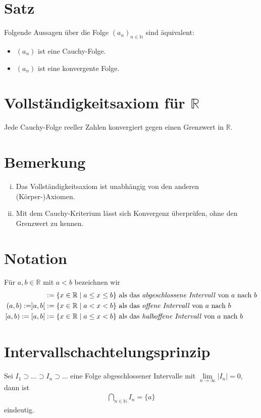 \documentclass{scrreprt}
\newcommand{\NN}{\mathbb{N}}
\newcommand{\RR}{\mathbb{R}}
\begin{document}
    \section{Satz}
    Folgende Aussagen über die Folge $(a_n)_{n \in \NN}$ sind äquivalent:
    \begin{itemize}
        \item
            $(a_n)$ ist eine Cauchy-Folge.
        \item
            $(a_n)$ ist eine konvergente Folge.
    \end{itemize}

    \section{Vollständigkeitsaxiom für $\RR$}
    Jede Cauchy-Folge reeller Zahlen konvergiert gegen einen Grenzwert in $\RR$.

    \section{Bemerkung}
    \begin{enumerate}[i)]
        \item
            Das Vollständigkeitsaxiom ist unabhängig von den anderen (Körper-)Axiomen.
        \item
            Mit dem Cauchy-Kriterium lässt sich Konvergenz überprüfen, ohne den Grenzwert zu kennen.
    \end{enumerate}

    \section{Notation}
    Für $a,b \in \RR$ mit $a < b$ bezeichnen wir
    \begin{align*}
        [a,b] &:= \lbrace x \in \RR \mid a \leq x \leq b \rbrace \text{ als das \emph{abgeschlossene Intervall} von $a$ nach $b$}\\
        (a,b) := ]a,b[ &:= \lbrace x \in \RR \mid a < x < b \rbrace \text{ als das \emph{offene Intervall} von $a$ nach $b$}\\
        [a,b) := [a,b[ &:= \lbrace x \in \RR \mid a \leq x < b \rbrace \text{ als das \emph{halboffene Intervall} von $a$ nach $b$}
    \end{align*}

    \section{Intervallschachtelungsprinzip}
    Sei $I_1 \supset \dots \supset I_n \supset \dots$ eine Folge abgeschlossener Intervalle mit $\lim\limits_{n \to \infty} |I_n| = 0$, dann ist
    \begin{align*}
        \bigcap_{n \in \NN} I_n = \lbrace a \rbrace
    \end{align*}
    eindeutig.
\end{document}
